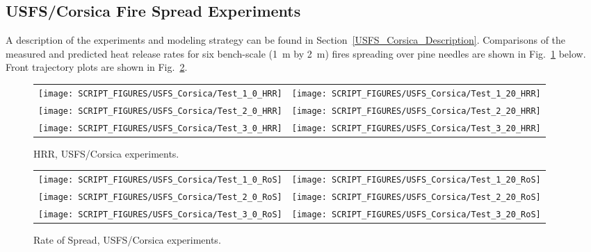 \clearpage

\subsection{USFS/Corsica Fire Spread Experiments}
\label{USFS_Corsica_Results}

A description of the experiments and modeling strategy can be found in Section~\ref{USFS_Corsica_Description}. Comparisons of the measured and predicted heat release rates for six bench-scale (1~m by 2~m) fires spreading over pine needles are shown in Fig.~\ref{USFS_Corsica_HRR} below. Front trajectory plots are shown in Fig.~\ref{USFS_Corsica_RoS}.

\begin{figure}[!ht]
\begin{tabular*}{\textwidth}{l@{\extracolsep{\fill}}r}
\texttt{[image: SCRIPT\_FIGURES/USFS\_Corsica/Test\_1\_0\_HRR]} &
\texttt{[image: SCRIPT\_FIGURES/USFS\_Corsica/Test\_1\_20\_HRR]} \\
\texttt{[image: SCRIPT\_FIGURES/USFS\_Corsica/Test\_2\_0\_HRR]} &
\texttt{[image: SCRIPT\_FIGURES/USFS\_Corsica/Test\_2\_20\_HRR]} \\
\texttt{[image: SCRIPT\_FIGURES/USFS\_Corsica/Test\_3\_0\_HRR]} &
\texttt{[image: SCRIPT\_FIGURES/USFS\_Corsica/Test\_3\_20\_HRR]}
\end{tabular*}
\caption[HRR, USFS/Corsica experiments]{HRR, USFS/Corsica experiments.}
\label{USFS_Corsica_HRR}
\end{figure}

\begin{figure}[p]
\begin{tabular*}{\textwidth}{l@{\extracolsep{\fill}}r}
\texttt{[image: SCRIPT\_FIGURES/USFS\_Corsica/Test\_1\_0\_RoS]} &
\texttt{[image: SCRIPT\_FIGURES/USFS\_Corsica/Test\_1\_20\_RoS]} \\
\texttt{[image: SCRIPT\_FIGURES/USFS\_Corsica/Test\_2\_0\_RoS]} &
\texttt{[image: SCRIPT\_FIGURES/USFS\_Corsica/Test\_2\_20\_RoS]} \\
\texttt{[image: SCRIPT\_FIGURES/USFS\_Corsica/Test\_3\_0\_RoS]} &
\texttt{[image: SCRIPT\_FIGURES/USFS\_Corsica/Test\_3\_20\_RoS]}
\end{tabular*}
\caption[Rate of Spread, USFS/Corsica experiments]{Rate of Spread, USFS/Corsica experiments.}
\label{USFS_Corsica_RoS}
\end{figure}




